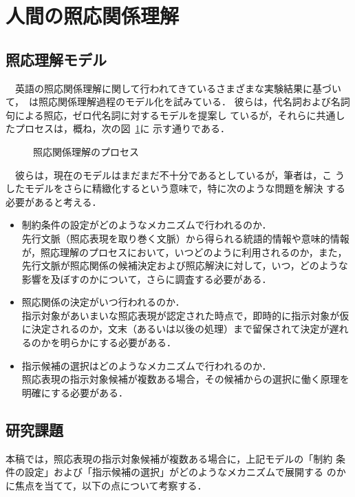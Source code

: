 \section{人間の照応関係理解}

\subsection{照応理解モデル}
　英語の照応関係理解に関して行われてきているさまざまな実験結果に基づい
て，~\cite{abe:1994}は照応関係理解過程のモデル化を試みている．
彼らは，代名詞および名詞句による照応，ゼロ代名詞に対するモデルを提案し
ているが，それらに共通したプロセスは，概ね，次の図~\ref{fig:process}に
示す通りである．

\begin{figure}[t]
  \begin{center}
  \end{center}
  \caption{照応関係理解のプロセス}
  \label{fig:process}
\end{figure}

　彼らは，現在のモデルはまだまだ不十分であるとしているが，筆者は，こ
うしたモデルをさらに精緻化するという意味で，特に次のような問題を解決
する必要があると考える．

\begin{itemize}
  \item 制約条件の設定がどのようなメカニズムで行われるのか．\\
  先行文脈（照応表現を取り巻く文脈）から得られる統語的情報や意味的情報
  が，照応理解のプロセスにおいて，いつどのように利用されるのか，また，
  先行文脈が照応関係の候補決定および照応解決に対して，いつ，どのような
  影響を及ぼすのかについて，さらに調査する必要がある．
  \item 照応関係の決定がいつ行われるのか．\\
  指示対象があいまいな照応表現が認定された時点で，即時的に指示対象が仮
  に決定されるのか，文末（あるいは以後の処理）まで留保されて決定が遅れ
  るのかを明らかにする必要がある．
  \item 指示候補の選択はどのようなメカニズムで行われるのか．\\
  照応表現の指示対象候補が複数ある場合，その候補からの選択に働く原理を
  明確にする必要がある．
\end{itemize}


\subsection{研究課題}
 本稿では，照応表現の指示対象候補が複数ある場合に，上記モデルの「制約
 条件の設定」および「指示候補の選択」がどのようなメカニズムで展開する
 のかに焦点を当てて，以下の点について考察する．

